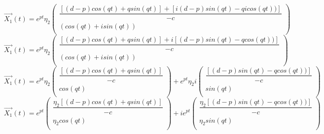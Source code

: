 \documentclass[a4paper]{article}
\begin{document}
    \begin{equation*}
        \vec{X_1}(t)=
        e^{pt}\eta_2
        \begin{pmatrix}
            \dfrac{[(d - p)cos(qt) + q sin(qt)] + [i (d - p) sin(qt) - q i cos(qt) )]}{-c} \\
            (cos(qt) + i sin(qt)) \\
        \end{pmatrix}
    \end{equation*}
    \begin{equation*}
        \vec{X_1}(t)=
        e^{pt}\eta_2
        \begin{pmatrix}
            \dfrac{[(d - p)cos(qt) + q sin(qt)] + i[(d - p) sin(qt) - q cos(qt) )]}{-c} \\
            (cos(qt) + i sin(qt)) \\
        \end{pmatrix}
    \end{equation*}
    \begin{equation*}
        \vec{X_1}(t)=
            e^{pt}\eta_2
            \begin{pmatrix}
                \dfrac{[(d - p)cos(qt) + q sin(qt)]}{-c} \\
                cos(qt) \\
            \end{pmatrix}
            +
            e^{pt}\eta_2 i
            \begin{pmatrix}
                \dfrac{[(d - p) sin(qt) - q cos(qt) )]}{-c} \\
                sin(qt) \\
            \end{pmatrix}
    \end{equation*}
    \begin{equation*}
        \vec{X_1}(t)=
        e^{pt}
        \begin{pmatrix}
            \dfrac{\eta_2[(d - p)cos(qt) + q sin(qt)]}{-c} \\
            \eta_2 cos(qt) \\
        \end{pmatrix}
        +
        i e^{pt}
        \begin{pmatrix}
            \dfrac{\eta_2[(d - p) sin(qt) - q cos(qt) )]}{-c} \\
            \eta_2 sin(qt) \\
        \end{pmatrix}
    \end{equation*}
\end{document}
